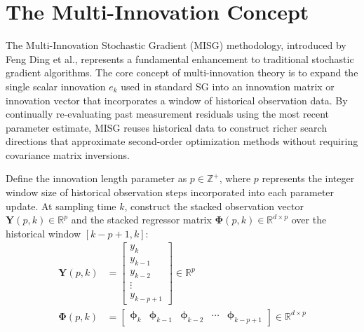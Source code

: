 \section{The Multi-Innovation Concept}
\label{sec:multi_innovation}

The Multi-Innovation Stochastic Gradient (MISG) methodology, introduced by Feng Ding et al., represents a fundamental enhancement to traditional stochastic gradient algorithms. The core concept of multi-innovation theory is to expand the single scalar innovation $e_k$ used in standard SG into an innovation matrix or innovation vector that incorporates a window of historical observation data. By continually re-evaluating past measurement residuals using the most recent parameter estimate, MISG reuses historical data to construct richer search directions that approximate second-order optimization methods without requiring covariance matrix inversions.

Define the innovation length parameter as $p \in \mathbb{Z}^+$, where $p$ represents the integer window size of historical observation steps incorporated into each parameter update. At sampling time $k$, construct the stacked observation vector $\mathbf{Y}(p, k) \in \mathbb{R}^p$ and the stacked regressor matrix $\boldsymbol{\Phi}(p, k) \in \mathbb{R}^{d \times p}$ over the historical window $[k-p+1, k]$:
\begin{align}
\mathbf{Y}(p, k) &= \begin{bmatrix} y_k \\ y_{k-1} \\ y_{k-2} \\ \vdots \\ y_{k-p+1} \end{bmatrix} \in \mathbb{R}^p \label{eq:misg_y_stacked} \\
\boldsymbol{\Phi}(p, k) &= \begin{bmatrix} \boldsymbol{\phi}_k & \boldsymbol{\phi}_{k-1} & \boldsymbol{\phi}_{k-2} & \cdots & \boldsymbol{\phi}_{k-p+1} \end{bmatrix} \in \mathbb{R}^{d \times p} \label{eq:misg_phi_stacked}
\end{align}

